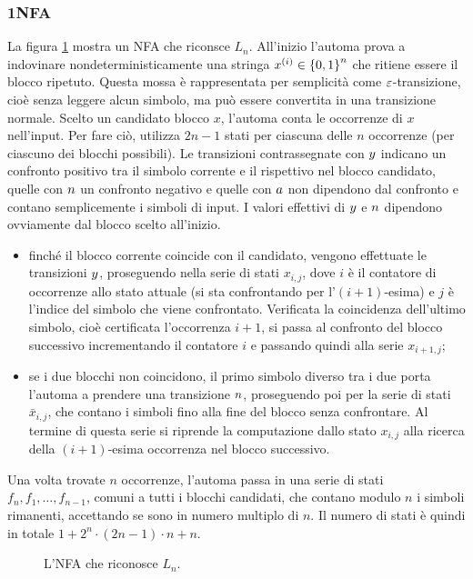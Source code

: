 \subsubsection{1NFA}
La figura \ref{img:wit:LnNFA} mostra un NFA che riconsce $L_n$. All'inizio l'automa prova a indovinare nondeterministicamente una stringa $x^{(i)}\in\left\{ 0,1 \right\}^n$ che ritiene essere il blocco ripetuto. Questa mossa è rappresentata per semplicità come $\varepsilon$-transizione, cioè senza leggere alcun simbolo, ma può essere convertita in una transizione normale. Scelto un candidato blocco $x$, l'automa conta le occorrenze di $x$ nell'input. Per fare ciò, utilizza $2n-1$ stati per ciascuna delle $n$ occorrenze (per ciascuno dei blocchi possibili). Le transizioni contrassegnate con $y$ indicano un confronto positivo tra il simbolo corrente e il rispettivo nel blocco candidato, quelle con $n$ un confronto negativo e quelle con $a$ non dipendono dal confronto e contano semplicemente i simboli di input. I valori effettivi di $y$ e $n$ dipendono ovviamente dal blocco scelto all'inizio.
\begin{itemize}
	\item finché il blocco corrente coincide con il candidato, vengono effettuate le transizioni $y$, proseguendo nella serie di stati $x_{i,j}$, dove $i$ è il contatore di occorrenze allo stato attuale (si sta confrontando per l'$(i+1)$-esima) e $j$ è l'indice del simbolo che viene confrontato. Verificata la coincidenza dell'ultimo simbolo, cioè certificata l'occorrenza $i+1$, si passa al confronto del blocco successivo incrementando il contatore $i$ e passando quindi alla serie $x_{i+1,j}$;
	\item se i due blocchi non coincidono, il primo simbolo diverso tra i due porta l'automa a prendere una transizione $n$, proseguendo poi per la serie di stati $\bar x_{i,j}$, che contano i simboli fino alla fine del blocco senza confrontare. Al termine di questa serie si riprende la computazione dallo stato $x_{i,j}$ alla ricerca della $(i+1)$-esima occorrenza nel blocco successivo.
\end{itemize}
Una volta trovate $n$ occorrenze, l'automa passa in una serie di stati $f_n,f_1,\dots,f_{n-1}$, comuni a tutti i blocchi candidati, che contano modulo $n$ i simboli rimanenti, accettando se sono in numero multiplo di $n$. Il numero di stati è quindi in totale $1+2^n\cdot (2n-1)\cdot n+n$.

\begin{figure}
	\centering
	
	\caption{L'NFA che riconosce $L_n$.}
	\label{img:wit:LnNFA}
\end{figure}

